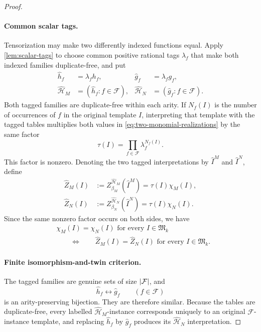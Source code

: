 \documentclass[11pt]{article}
\theoremstyle{plain}
\theoremstyle{definition}
\theoremstyle{remark}
\newcommand{\cF}{\mathcal F}
\newcommand{\InstMonoid}[1]{\mathfrak M_{#1}}
\DeclarePairedDelimiter{\abs}{\lvert}{\rvert}
\begin{document}
\begin{proof}
\paragraph{Common scalar tags.}
Tensorization may make two differently indexed functions equal.  Apply
\cref{lem:scalar-tags} to choose common positive rational tags $\lambda_f$
that make both indexed families duplicate-free, and put
\[
\begin{aligned}
  \widehat h_f&=\lambda_fh_f,
  &\widehat g_f&=\lambda_fg_f,\\
  \widehat{\mathcal H}_M&=(\widehat h_f:f\in\cF),
  &\widehat{\mathcal H}_N&=(\widehat g_f:f\in\cF).
\end{aligned}
\]
Both tagged families are duplicate-free within each arity.  If $N_f(I)$ is
the number of occurrences of $f$ in the original template $I$, interpreting
that template with the tagged tables multiplies both values in
\eqref{eq:two-monomial-realizations} by the same factor
\begin{equation*}
  \tau(I)=\prod_{f\in\cF}\lambda_f^{N_f(I)}.
\end{equation*}
This factor is nonzero.  Denoting the two tagged interpretations by
$\widehat I^M$ and $\widehat I^N$, define
\begin{align*}
  \widehat Z_M(I)
  &:=Z_{\beta_M}^{\widehat{\mathcal H}_M}(\widehat I^M)
    =\tau(I)\chi_M(I),\\
  \widehat Z_N(I)
  &:=Z_{\beta_N}^{\widehat{\mathcal H}_N}(\widehat I^N)
    =\tau(I)\chi_N(I).
\end{align*}
Since the same nonzero factor occurs on both sides, we have
\begin{equation}
\begin{aligned}
  &\chi_M(I)=\chi_N(I)
    \text{ for every }I\in\InstMonoid{k}\\
  &\qquad\Longleftrightarrow\qquad
    \widehat Z_M(I)=\widehat Z_N(I)
    \text{ for every }I\in\InstMonoid{k}.
\end{aligned}
  \label{eq:character-agreement-tagged-agreement}
\end{equation}

\paragraph{Finite isomorphism-and-twin criterion.}
The tagged families are genuine sets of size $\abs{\cF}$, and
\[
  \widehat h_f\longleftrightarrow\widehat g_f
  \qquad(f\in\cF)
\]
is an arity-preserving bijection.  They are therefore similar.  Because the
tables are duplicate-free, every labelled
$\widehat{\mathcal H}_M$-instance corresponds uniquely to an original
$\cF$-instance template, and replacing $\widehat h_f$ by
$\widehat g_f$ produces its $\widehat{\mathcal H}_N$ interpretation.


\end{proof}
\end{document}
